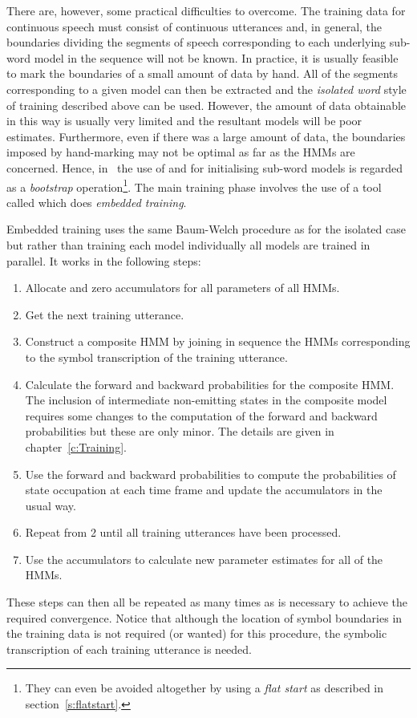 There are, however, some
practical difficulties to overcome.  The training
data for continuous speech must consist of continuous utterances and,
in general, the boundaries dividing the segments of speech
corresponding to each underlying sub-word model in the sequence will not
be known.  In practice, it is usually feasible to mark the boundaries
of a small amount of data by hand.  All of the segments corresponding
to a given model can then be extracted and the {\it isolated word}
style of training described above can be used.  However, the 
amount of data obtainable in this way is usually very limited and
the resultant models will be poor estimates.  Furthermore, even
if there was a large amount of data, the boundaries imposed by
hand-marking may not be optimal as far as the HMMs are concerned.
Hence, in \HTK\ the use of  and 
for initialising sub-word
models is regarded as a {\it bootstrap} operation\footnote{
They can even be avoided altogether by using a \textit{flat start}
as described in section~\ref{s:flatstart}.}.
The main
training phase involves the use of a tool called 
 which does
{\it embedded training}.

Embedded training uses the same 
Baum-Welch procedure as for the 
isolated case but rather than training each model individually
all models are trained in parallel.  It works in the following 
steps:
\begin{enumerate}
\item Allocate and zero accumulators for all parameters of all HMMs.
\item Get the next training utterance.
\item Construct a composite HMM by joining in sequence  the
      HMMs corresponding to the symbol transcription of the
      training utterance. 
\item Calculate the forward and backward probabilities for the
      composite HMM.  The inclusion of
      intermediate non-emitting states in the composite model 
      requires some changes to the computation of the forward
      and backward probabilities but these are only minor.  The
      details are given in chapter~\ref{c:Training}.
\item Use the forward and backward probabilities to compute 
      the probabilities of state occupation at each time frame
      and update the accumulators in the usual way.
\item Repeat from 2 until all training utterances have been
      processed.
\item Use the accumulators to calculate new parameter estimates
      for all of the HMMs.
\end{enumerate}
These steps can then all be repeated as many times as is necessary
to achieve the required convergence.  Notice that although the
location of symbol boundaries in the training data is not 
required (or wanted) for this procedure, the symbolic transcription
of each training utterance is needed.

